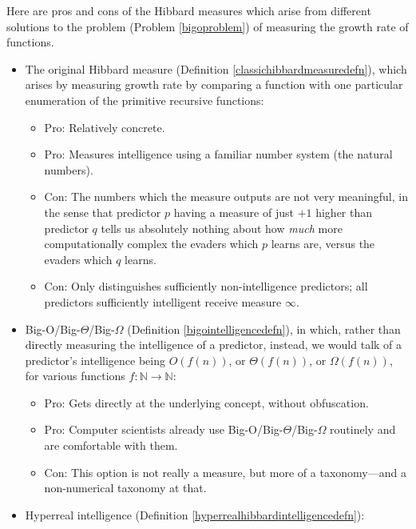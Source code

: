 \documentclass{article}
\begin{document}
Here are pros and cons of the Hibbard measures which arise from different solutions
to the problem (Problem \ref{bigoproblem}) of measuring the growth rate of functions.

\begin{itemize}
    \item
    The original Hibbard measure (Definition \ref{classichibbardmeasuredefn}),
    which arises by measuring growth rate by comparing
    a function with one particular enumeration \cite{liu1960enumeration} of the primitive
    recursive functions:
    \begin{itemize}
        \item
        Pro: Relatively concrete.
        \item
        Pro: Measures intelligence using a familiar number system (the natural numbers).
        \item
        Con: The numbers which the measure outputs are not very meaningful, in the sense
        that predictor $p$ having a measure of
        just $+1$ higher than predictor $q$ tells us absolutely
        nothing about how \emph{much} more computationally complex the evaders which $p$
        learns are, versus the evaders which $q$ learns.
        \item
        Con: Only distinguishes sufficiently non-intelligence predictors; all predictors
        sufficiently intelligent receive measure $\infty$.
    \end{itemize}
    \item
    Big-O/Big-$\Theta$/Big-$\Omega$ (Definition \ref{bigointelligencedefn}),
    in which, rather than directly measuring the intelligence of a predictor, instead, we
    would talk of a predictor's intelligence being $O(f(n))$, or $\Theta(f(n))$, or
    $\Omega(f(n))$, for various functions $f:\mathbb N\to\mathbb N$:
    \begin{itemize}
        \item
        Pro: Gets directly at the underlying concept, without obfuscation.
        \item
        Pro: Computer scientists already use Big-O/Big-$\Theta$/Big-$\Omega$ routinely
        and are comfortable with them.
        \item
        Con: This option is not really a measure, but more of a taxonomy---and a non-numerical
        taxonomy at that.
    \end{itemize}
    \item
    Hyperreal intelligence (Definition \ref{hyperrealhibbardintelligencedefn}):

\end{itemize}
\end{document}
